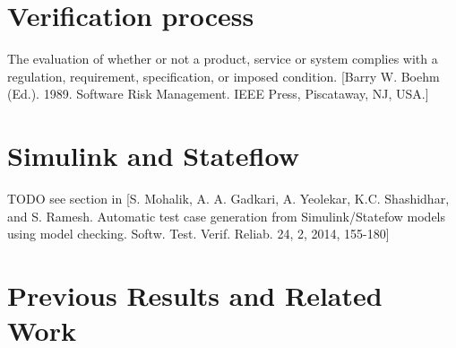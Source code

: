 \section{Verification process}

The evaluation of whether or not a product, service or system complies with a regulation, requirement, specification, or imposed condition. [Barry W. Boehm (Ed.). 1989. Software Risk Management. IEEE Press, Piscataway, NJ, USA.]

\section{Simulink and Stateflow}

TODO see section in [S. Mohalik, A. A. Gadkari, A. Yeolekar, K.C. Shashidhar, and S. Ramesh. Automatic test case generation from Simulink/Statefow models using model checking. Softw. Test. Verif. Reliab. 24, 2, 2014, 155-180]

\section{Previous Results and Related Work}
%